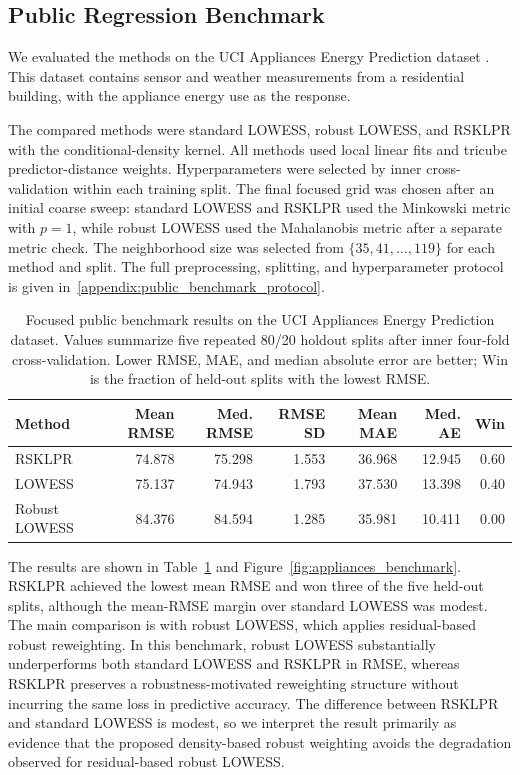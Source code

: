 \documentclass[preprint,1p,times,authoryear]{elsarticle}
\begin{document}
\subsection{Public Regression Benchmark}
We evaluated the methods on the UCI Appliances Energy Prediction dataset \citep{UCIAppliancesEnergyPrediction,CandanedoFeldheimDeramaix2017}. This dataset contains sensor and weather measurements from a residential building, with the appliance energy use as the response.

The compared methods were standard LOWESS, robust LOWESS, and RSKLPR with the conditional-density kernel. All methods used local linear fits and tricube predictor-distance weights. Hyperparameters were selected by inner cross-validation within each training split. The final focused grid was chosen after an initial coarse sweep: standard LOWESS and RSKLPR used the Minkowski metric with $p=1$, while robust LOWESS used the Mahalanobis metric after a separate metric check. The neighborhood size was selected from $\{35,41,\ldots,119\}$ for each method and split. The full preprocessing, splitting, and hyperparameter protocol is given in~\ref{appendix:public_benchmark_protocol}.

\begin{table}[t]
\caption{Focused public benchmark results on the UCI Appliances Energy Prediction dataset. Values summarize five repeated 80/20 holdout splits after inner four-fold cross-validation. Lower RMSE, MAE, and median absolute error are better; Win is the fraction of held-out splits with the lowest RMSE.}
\centering
\scriptsize
\begin{tabular}{lrrrrrr}
\toprule
Method & Mean RMSE & Med. RMSE & RMSE SD & Mean MAE & Med. AE & Win \\
\midrule
RSKLPR & 74.878 & 75.298 & 1.553 & 36.968 & 12.945 & 0.60 \\
LOWESS & 75.137 & 74.943 & 1.793 & 37.530 & 13.398 & 0.40 \\
Robust LOWESS & 84.376 & 84.594 & 1.285 & 35.981 & 10.411 & 0.00 \\
\bottomrule
\end{tabular}
\label{tab:appliances_benchmark}
\end{table}

The results are shown in Table~\ref{tab:appliances_benchmark} and Figure~\ref{fig:appliances_benchmark}. RSKLPR achieved the lowest mean RMSE and won three of the five held-out splits, although the mean-RMSE margin over standard LOWESS was modest. The main comparison is with robust LOWESS, which applies residual-based robust reweighting. In this benchmark, robust LOWESS substantially underperforms both standard LOWESS and RSKLPR in RMSE, whereas RSKLPR preserves a robustness-motivated reweighting structure without incurring the same loss in predictive accuracy. The difference between RSKLPR and standard LOWESS is modest, so we interpret the result primarily as evidence that the proposed density-based robust weighting avoids the degradation observed for residual-based robust LOWESS.
\end{document}
